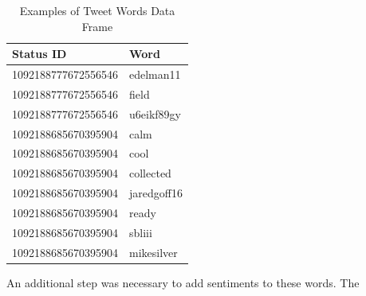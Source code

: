 \documentclass[12pt,twoside]{reedthesis}
\newenvironment{Shaded}{\begin{snugshade}}{\end{snugshade}}
\newcommand{\KeywordTok}[1]{\textcolor[rgb]{0.13,0.29,0.53}{\textbf{#1}}}
\newcommand{\DataTypeTok}[1]{\textcolor[rgb]{0.13,0.29,0.53}{#1}}
\newcommand{\StringTok}[1]{\textcolor[rgb]{0.31,0.60,0.02}{#1}}
\newcommand{\CommentTok}[1]{\textcolor[rgb]{0.56,0.35,0.01}{\textit{#1}}}
\newcommand{\OperatorTok}[1]{\textcolor[rgb]{0.81,0.36,0.00}{\textbf{#1}}}
\newcommand{\NormalTok}[1]{#1}
\begin{document}
\small
\begin{Shaded}
\end{Shaded}
\normalsize
\begin{table}[!h]

\caption[Examples of Tweet Words Data Frame]{\label{tab:tweetwords}Examples of Tweet Words Data Frame}
\centering
\begin{tabular}{l|l}
\hline
Status ID & Word\\
\hline
1092188777672556546 & edelman11\\
\hline
1092188777672556546 & field\\
\hline
1092188777672556546 & u6eikf89gy\\
\hline
1092188685670395904 & calm\\
\hline
1092188685670395904 & cool\\
\hline
1092188685670395904 & collected\\
\hline
1092188685670395904 & jaredgoff16\\
\hline
1092188685670395904 & ready\\
\hline
1092188685670395904 & sbliii\\
\hline
1092188685670395904 & mikesilver\\
\hline
\end{tabular}
\end{table}
An additional step was necessary to add sentiments to these words. The
\end{document}

